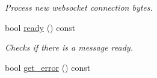 \begin{DoxyCompactItemize}
\begin{DoxyCompactList}\small\item\em Process new websocket connection bytes. \end{DoxyCompactList}\item 
bool \hyperlink{classwebsocketpp_1_1processor_1_1hybi00_a8a0ebdb322dad95ea3c7aee8e5c56b9a}{ready} () const
\begin{DoxyCompactList}\small\item\em Checks if there is a message ready. \end{DoxyCompactList}\item 
bool \hyperlink{classwebsocketpp_1_1processor_1_1hybi00_a86ed2943be17c9775153a9731289c16e}{get\+\_\+error} () const\hypertarget{classwebsocketpp_1_1processor_1_1hybi00_a86ed2943be17c9775153a9731289c16e}{}\label{classwebsocketpp_1_1processor_1_1hybi00_a86ed2943be17c9775153a9731289c16e}


\end{DoxyCompactItemize}
